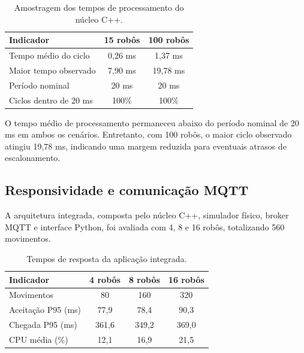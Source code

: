 \documentclass[12pt,a4paper]{article}
\begin{document}
\begin{table}[H]
    \centering
    \small
    \caption{Amostragem dos tempos de processamento do núcleo C++.}
    \label{tab:desempenho_core}
    \begin{tabular}{lcc}
        \toprule
        \textbf{Indicador}     & \textbf{15 robôs} & \textbf{100 robôs} \\
        \midrule
        Tempo médio do ciclo   & 0,26 ms           & 1,37 ms            \\
        Maior tempo observado  & 7,90 ms           & 19,78 ms           \\
        Período nominal        & 20 ms             & 20 ms              \\
        Ciclos dentro de 20 ms & 100\%             & 100\%              \\
        \bottomrule
    \end{tabular}
\end{table}

O tempo médio de processamento permaneceu abaixo do período nominal de 20 ms em
ambos os cenários. Entretanto, com 100 robôs, o maior ciclo observado atingiu
19,78 ms, indicando uma margem reduzida para eventuais atrasos de
escalonamento.

\subsection{Responsividade e comunicação MQTT}

A arquitetura integrada, composta pelo núcleo C++, simulador físico, broker
MQTT e interface Python, foi avaliada com 4, 8 e 16 robôs, totalizando 560
movimentos.

\begin{table}[H]
    \centering
    \small
    \caption{Tempos de resposta da aplicação integrada.}
    \label{tab:desempenho_mqtt}
    \begin{tabular}{lccc}
        \toprule
        \textbf{Indicador} & \textbf{4 robôs} & \textbf{8 robôs} & \textbf{16 robôs} \\
        \midrule
        Movimentos         & 80               & 160              & 320               \\
        Aceitação P95 (ms) & 77,9             & 78,4             & 90,3              \\
        Chegada P95 (ms)   & 361,6            & 349,2            & 369,0             \\
        CPU média (\%)     & 12,1             & 16,9             & 21,5              \\
        \bottomrule
    \end{tabular}
\end{table}
\end{document}
